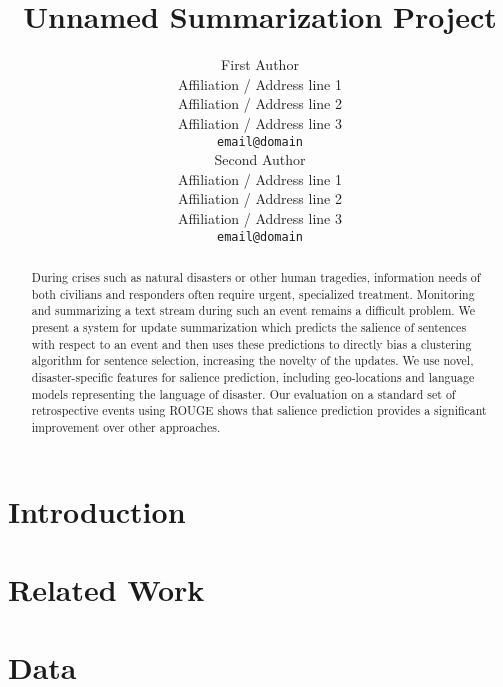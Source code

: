 \documentclass[11pt]{article}
\title{Unnamed Summarization Project}
\author{First Author \\
  Affiliation / Address line 1 \\
  Affiliation / Address line 2 \\
  Affiliation / Address line 3 \\
  {\tt email@domain} \\\And
  Second Author \\
  Affiliation / Address line 1 \\
  Affiliation / Address line 2 \\
  Affiliation / Address line 3 \\
  {\tt email@domain} \\}
\date{}
\begin{document}
\maketitle
\begin{abstract}
During crises such as natural disasters or other human tragedies, information
needs of both civilians and responders often require urgent, specialized
treatment.  
Monitoring and summarizing a text stream
during such an event remains a difficult problem. 
We present a system for update summarization which predicts the salience of 
sentences with respect to an event and then uses these
predictions to directly bias a clustering algorithm for sentence selection,
increasing the novelty of the updates. We use novel, disaster-specific features
for salience prediction, including geo-locations and language models
representing the language of disaster.
Our evaluation on a standard set of retrospective events using ROUGE shows 
that salience prediction provides a significant improvement over 
other approaches.



\end{abstract}

\section{Introduction}



\section{Related Work}


%

\section{Data}

\end{document}
